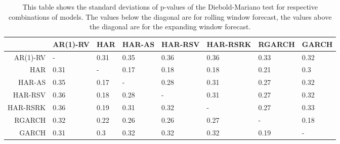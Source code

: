 \begin{table}[ht]
\centering
\begin{tabular}{rlllllll}
  \hline
 & AR(1)-RV & HAR & HAR-AS & HAR-RSV & HAR-RSRK & RGARCH & GARCH \\ 
  \hline
AR(1)-RV & - & 0.31 & 0.35 & 0.36 & 0.36 & 0.33 & 0.32 \\ 
  HAR & 0.31 & - & 0.17 & 0.18 & 0.18 & 0.21 & 0.3 \\ 
  HAR-AS & 0.35 & 0.17 & - & 0.28 & 0.31 & 0.27 & 0.32 \\ 
  HAR-RSV & 0.36 & 0.18 & 0.28 & - & 0.31 & 0.27 & 0.32 \\ 
  HAR-RSRK & 0.36 & 0.19 & 0.31 & 0.32 & - & 0.27 & 0.33 \\ 
  RGARCH & 0.32 & 0.22 & 0.26 & 0.26 & 0.27 & - & 0.18 \\ 
  GARCH & 0.31 & 0.3 & 0.32 & 0.32 & 0.32 & 0.19 & - \\ 
   \hline
\end{tabular}
\caption[DM test standard deviations]{This table shows the standard deviations of p-values of the Diebold-Mariano test for respective combinations of models. 
                The values below the diagonal are for rolling window forecast, the values above the diagonal are for the expanding window forecast.} 
\label{Table:DM_test_SD}
\end{table}
